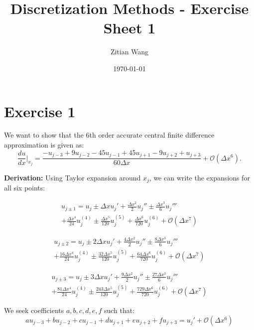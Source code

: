 \documentclass[a4paper, 12pt]{article}
\title{Discretization Methods - Exercise Sheet 1}
\author{Zitian Wang}
\date{\today}
\begin{document}
\maketitle

\section*{Exercise 1}

We want to show that the 6th order accurate central finite difference approximation is given as:
\begin{equation}
    \frac{du}{dx}\Big|_{x_j} = \frac{-u_{j-3} + 9u_{j-2} - 45u_{j-1} + 45u_{j+1} - 9u_{j+2} + u_{j+3}}{60 \Delta x} + \mathcal{O}(\Delta x^6).
\end{equation}

\textbf{Derivation:} Using Taylor expansion around $x_j$, we can write the expansions for all six points:

\begin{multline}
    u_{j\pm 1} = u_j \pm \Delta x u_j' + \frac{\Delta x^2}{2} u_j'' \pm \frac{\Delta x^3}{6} u_j''' \\
    + \frac{\Delta x^4}{24} u_j^{(4)} \pm \frac{\Delta x^5}{120} u_j^{(5)} + \frac{\Delta x^6}{720} u_j^{(6)} + \mathcal{O}(\Delta x^7)
\end{multline}

\begin{multline}
    u_{j\pm 2} = u_j \pm 2\Delta x u_j' + \frac{4\Delta x^2}{2} u_j'' \pm \frac{8\Delta x^3}{6} u_j''' \\
    + \frac{16\Delta x^4}{24} u_j^{(4)} \pm \frac{32\Delta x^5}{120} u_j^{(5)} + \frac{64\Delta x^6}{720} u_j^{(6)} + \mathcal{O}(\Delta x^7)
\end{multline}

\begin{multline}
    u_{j\pm 3} = u_j \pm 3\Delta x u_j' + \frac{9\Delta x^2}{2} u_j'' \pm \frac{27\Delta x^3}{6} u_j''' \\
    + \frac{81\Delta x^4}{24} u_j^{(4)} \pm \frac{243\Delta x^5}{120} u_j^{(5)} + \frac{729\Delta x^6}{720} u_j^{(6)} + \mathcal{O}(\Delta x^7)
\end{multline}

We seek coefficients $a, b, c, d, e, f$ such that:
\begin{equation}
    a u_{j-3} + b u_{j-2} + c u_{j-1} + d u_{j+1} + e u_{j+2} + f u_{j+3} = u_j' + \mathcal{O}(\Delta x^6)
\end{equation}
\end{document}
